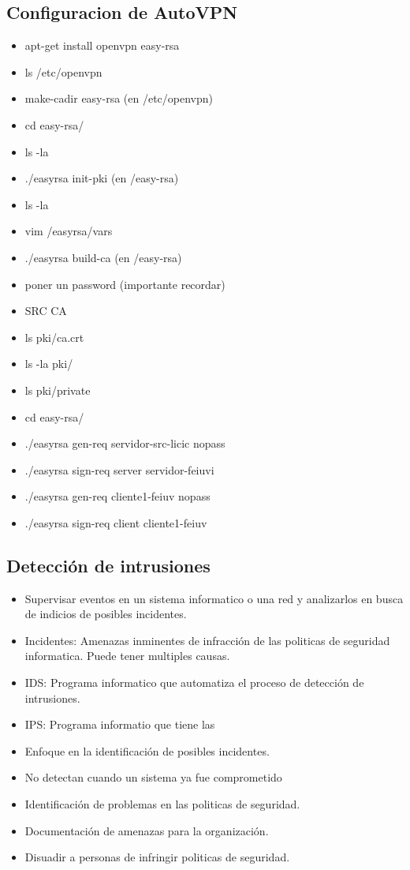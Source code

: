 \documentclass[11pt]{article}
\begin{document}
\subsection{Configuracion de AutoVPN}
\label{sec:orgfda7d54}
\begin{itemize}
\item apt-get install openvpn easy-rsa
\item ls /etc/openvpn
\item make-cadir easy-rsa (en /etc/openvpn)
\item cd easy-rsa/
\item ls -la
\item ./easyrsa init-pki (en /easy-rsa)
\item ls -la
\item vim /easyrsa/vars
\item ./easyrsa build-ca (en /easy-rsa)
\item poner un password (importante recordar)
\item SRC CA
\item ls pki/ca.crt
\item ls -la pki/
\item ls pki/private
\item cd easy-rsa/
\item ./easyrsa gen-req servidor-src-licic nopass
\item ./easyrsa sign-req server servidor-feiuvi
\item ./easyrsa gen-req cliente1-feiuv nopass
\item ./easyrsa sign-req client cliente1-feiuv
\end{itemize}
\subsection{Detección de intrusiones}
\label{sec:org5b7e839}
\begin{itemize}
\item Supervisar eventos en un sistema informatico o una red y analizarlos en busca de indicios de posibles incidentes.
\item Incidentes: Amenazas inminentes de infracción de las politicas de seguridad informatica. Puede tener multiples causas.

\item IDS: Programa informatico que automatiza el proceso de detección de intrusiones.
\item IPS: Programa informatio que tiene las

\item Enfoque en la identificación de posibles incidentes.
\item No detectan cuando un sistema ya fue comprometido

\item Identificación de problemas en las politicas de seguridad.
\item Documentación de amenazas para la organización.
\item Disuadir a personas de infringir politicas de seguridad.
\end{itemize}
\end{document}
